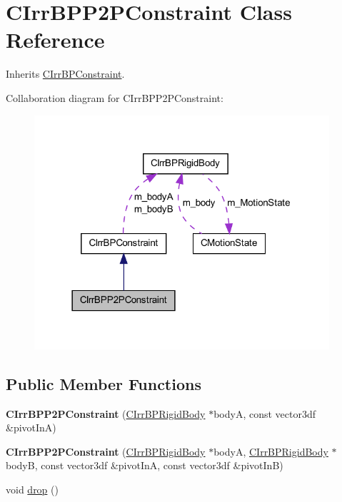 \hypertarget{class_c_irr_b_p_p2_p_constraint}{
\section{CIrrBPP2PConstraint Class Reference}
\label{class_c_irr_b_p_p2_p_constraint}
}


Inherits \hyperlink{class_c_irr_b_p_constraint}{CIrrBPConstraint}.



Collaboration diagram for CIrrBPP2PConstraint:\nopagebreak
\begin{figure}[H]
\begin{center}
\leavevmode
\includegraphics[width=310pt]{class_c_irr_b_p_p2_p_constraint__coll__graph}
\end{center}
\end{figure}
\subsection*{Public Member Functions}
\begin{DoxyCompactItemize}
\item 
\hypertarget{class_c_irr_b_p_p2_p_constraint_a7bcd4e6890eda89a126d139db2691bbc}{
{\bfseries CIrrBPP2PConstraint} (\hyperlink{class_c_irr_b_p_rigid_body}{CIrrBPRigidBody} $\ast$bodyA, const vector3df \&pivotInA)}
\label{class_c_irr_b_p_p2_p_constraint_a7bcd4e6890eda89a126d139db2691bbc}

\item 
\hypertarget{class_c_irr_b_p_p2_p_constraint_a0fcb7e338114b3bd920d370e2cef017b}{
{\bfseries CIrrBPP2PConstraint} (\hyperlink{class_c_irr_b_p_rigid_body}{CIrrBPRigidBody} $\ast$bodyA, \hyperlink{class_c_irr_b_p_rigid_body}{CIrrBPRigidBody} $\ast$bodyB, const vector3df \&pivotInA, const vector3df \&pivotInB)}
\label{class_c_irr_b_p_p2_p_constraint_a0fcb7e338114b3bd920d370e2cef017b}

\item 
void \hyperlink{class_c_irr_b_p_p2_p_constraint_abc3ec07fbc260cb8f88727fd8e9fc2c6}{drop} ()
\end{DoxyCompactItemize}


